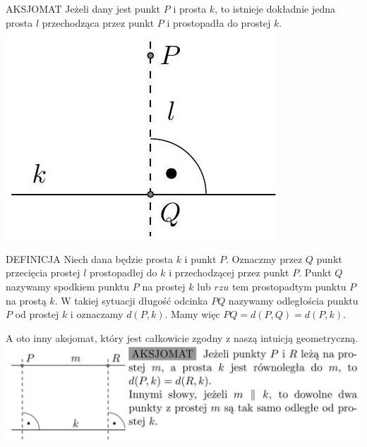 \documentclass[10pt]{article}
\begin{document}
AKSJOMAT Jeżeli dany jest punkt \(P\) i prosta \(k\), to istnieje dokładnie jedna prosta \(l\) przechodząca przez punkt \(P\) i prostopadła do prostej \(k\).\\
\includegraphics[max width=\textwidth, center]{2024_11_21_71f62bd117d375398909g-010}

DEFINICJA Niech dana będzie prosta \(k\) i punkt \(P\). Oznaczmy przez \(Q\) punkt przecięcia prostej \(l\) prostopadłej do \(k\) i przechodzącej przez punkt \(P\). Punkt \(Q\) nazywamy spodkiem punktu \(P\) na prostej \(k\) lub \(r z u\) tem prostopadtym punktu \(P\) na prostą \(k\). W takiej sytuacji długość odcinka \(P Q\) nazywamy odległościa punktu \(P\) od prostej \(k\) i oznaczamy \(d(P, k)\). Mamy więc \(P Q=d(P, Q)=d(P, k)\).

A oto inny aksjomat, który jest całkowicie zgodny z naszą intuicją geometryczną.\\
\includegraphics[max width=\textwidth, center]{2024_11_21_71f62bd117d375398909g-010(2)}
\end{document}
